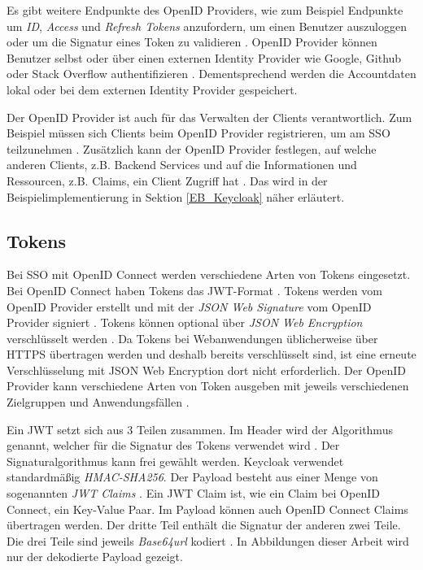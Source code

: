 Es gibt weitere Endpunkte des OpenID Providers, wie zum Beispiel Endpunkte um \textit{ID}, \textit{Access} und \textit{Refresh Tokens} anzufordern, um einen Benutzer auszuloggen oder um die Signatur eines Token zu validieren \cite[Keycloak URI Endpoints]{keycloakDocs}. OpenID Provider können Benutzer selbst oder über einen externen Identity Provider wie Google, Github oder Stack Overflow authentifizieren \cite{EB7} \cite[Social Identity Providers]{keycloakDocs}. Dementsprechend werden die Accountdaten lokal oder bei dem externen Identity Provider gespeichert.

Der OpenID Provider ist auch für das Verwalten der Clients verantwortlich. Zum Beispiel müssen sich Clients beim OpenID Provider registrieren, um am SSO teilzunehmen \cite[Client Registration]{EB26} \cite{EB57}. Zusätzlich kann der OpenID Provider festlegen, auf welche anderen Clients, z.B. Backend Services und auf die Informationen und Ressourcen, z.B. Claims, ein Client Zugriff hat \cite[Audience Support]{keycloakDocs} \cite[ID Token]{EB4}. Das wird in der Beispielimplementierung in Sektion \ref{EB_Keycloak} näher erläutert.

\subsection{Tokens} \label{EB_Tokens}

Bei SSO mit OpenID Connect werden verschiedene Arten von Tokens eingesetzt. Bei OpenID Connect haben Tokens das JWT-Format \cite{RFC7519}. Tokens werden vom OpenID Provider erstellt und mit der \textit{JSON Web Signature} vom OpenID Provider signiert \cite{EB5}. Tokens können optional über \textit{JSON Web Encryption} verschlüsselt werden \cite{EB5}. Da Tokens bei Webanwendungen üblicherweise über HTTPS übertragen werden und deshalb bereits verschlüsselt sind, ist eine erneute Verschlüsselung mit JSON Web Encryption dort nicht erforderlich. Der OpenID Provider kann verschiedene Arten von Token ausgeben mit jeweils verschiedenen Zielgruppen und Anwendungsfällen \cite[Token Endpoint]{EB4}.

Ein JWT setzt sich aus 3 Teilen zusammen. Im Header wird der Algorithmus genannt, welcher für die Signatur des Tokens verwendet wird \cite{EB5}. Der Signaturalgorithmus kann frei gewählt werden. Keycloak verwendet standardmäßig \textit{HMAC-SHA256}. Der Payload besteht aus einer Menge von sogenannten \textit{JWT Claims} \cite{EB5}. Ein JWT Claim ist, wie ein Claim bei OpenID Connect, ein Key-Value Paar. Im Payload können auch OpenID Connect Claims übertragen werden. Der dritte Teil enthält die Signatur der anderen zwei Teile. Die drei Teile sind jeweils \textit{Base64url} kodiert \cite{EB5}. In Abbildungen dieser Arbeit wird nur der dekodierte Payload gezeigt.

